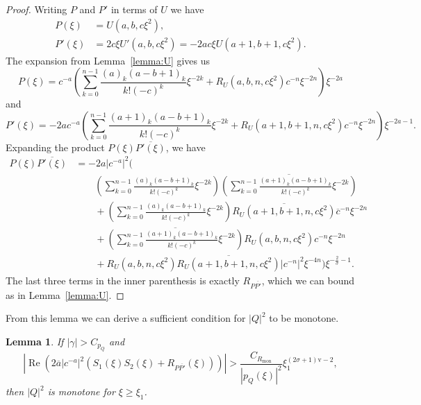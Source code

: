 \documentclass[11pt]{article}
\DeclareMathOperator{\real}{Re}
\newcommand{\conj}[1]{\overline{#1}}
\newcommand{\normv}{\mathrm{v}}
\newtheorem{lemma}[definition]{Lemma}
\begin{document}
\begin{proof}
  Writing \(P\) and \(P'\) in terms of \(U\) we have
  \begin{align*}
    P(\xi)
    &= U(a, b, c\xi^{2}),\\
    P'(\xi)
    &= 2c\xi U'(a, b, c\xi^{2}) = -2ac\xi U(a + 1, b + 1, c\xi^{2}).
  \end{align*}
  The expansion from Lemma~\ref{lemma:U} gives us
  \begin{equation*}
    P(\xi) = c^{-a}\left(\sum_{k = 0}^{n - 1} \frac{(a)_{k}(a - b + 1)_{k}}{k!(-c)^{k}}\xi^{-2k} + R_{U}(a, b, n, c\xi^{2})c^{-n}\xi^{-2n}\right)\xi^{-2a}
  \end{equation*}
  and
  \begin{equation*}
    P'(\xi) = -2ac^{-a}\left(\sum_{k = 0}^{n - 1} \frac{(a + 1)_{k}(a - b + 1)_{k}}{k!(-c)^{k}}\xi^{-2k} + R_{U}(a + 1, b + 1, n, c\xi^{2})c^{-n}\xi^{-2n}\right)\xi^{-2a - 1}.
  \end{equation*}
  Expanding the product \(P(\xi)\conj{P'(\xi)}\), we have
  \begin{equation*}
    \begin{split}
      P(\xi)\conj{P'(\xi)}
      &= -2a|c^{-a}|^{2}\Bigg(\\
      &\qquad\left(\sum_{k = 0}^{n - 1} \frac{(a)_{k}(a - b + 1)_{k}}{k!(-c)^{k}}\xi^{-2k}\right)
        \conj{\left(\sum_{k = 0}^{n - 1} \frac{(a + 1)_{k}(a - b + 1)_{k}}{k!(-c)^{k}}\xi^{-2k}\right)}\\
      &\qquad+ \left(\sum_{k = 0}^{n - 1} \frac{(a)_{k}(a - b + 1)_{k}}{k!(-c)^{k}}\xi^{-2k}\right)\conj{R_{U}(a + 1, b + 1, n, c\xi^{2})}\conj{c}^{-n}\xi^{-2n}\\
      &\qquad+ \conj{\left(\sum_{k = 0}^{n - 1} \frac{(a + 1)_{k}(a - b + 1)_{k}}{k!(-c)^{k}}\xi^{-2k}\right)}R_{U}(a, b, n, c\xi^{2})c^{-n}\xi^{-2n}\\
      &\qquad+ R_{U}(a, b, n, c\xi^{2})\conj{R_{U}(a + 1, b + 1, n, c\xi^{2})}|c^{-n}|^{2}\xi^{-4n}
        \Bigg)\xi^{-\frac{2}{\sigma} - 1}.
    \end{split}
  \end{equation*}
  The last three terms in the inner parenthesis is exactly
  \(R_{P\conj{P'}}\), which we can bound as in Lemma~\ref{lemma:U}.
\end{proof}

From this lemma we can derive a sufficient condition for \(|Q|^{2}\)
to be monotone.

\begin{lemma}\label{lemma:monotonicity-infinity}
  If \(|\gamma| > C_{p_{Q}}\) and
  \begin{equation}\label{eq:monotonicity-infinity}
    \left|\real\left(2\conj{a}|c^{-a}|^{2}(S_{1}(\xi)S_{2}(\xi) + R_{P\conj{P'}}(\xi))\right)\right|
    > \frac{C_{R_{\mathrm{mon}}}}{|p_{Q}(\xi)|^{2}}\xi_{1}^{(2\sigma + 1)\normv - 2},
  \end{equation}
  then \(|Q|^{2}\) is monotone for \(\xi \geq \xi_{1}\).
\end{lemma}
\end{document}
